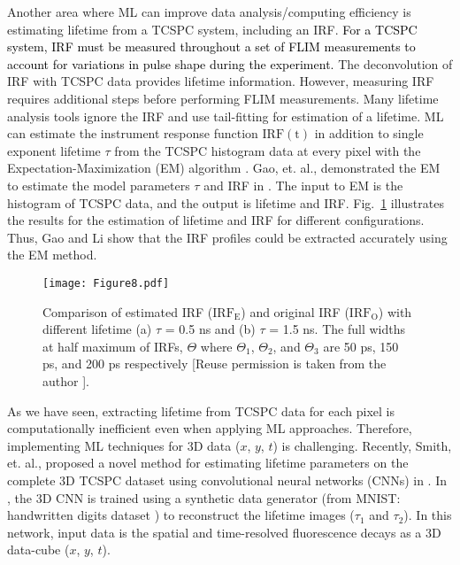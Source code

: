 \documentclass[12pt]{iopart}
\newcommand{\cc}[1]{\textcolor{black}{#1}}
\begin{document}
Another area where ML can improve data analysis/computing efficiency is estimating lifetime from a TCSPC system, including an IRF. \cc{For a TCSPC system, IRF must be measured throughout a set of FLIM measurements to account for variations in pulse shape during the experiment.} The deconvolution of IRF with TCSPC data provides lifetime information. However, measuring IRF requires additional steps before performing FLIM measurements. Many lifetime analysis tools ignore the IRF and use tail-fitting for estimation of a lifetime. ML can estimate the instrument response function $\mathrm{IRF(t)}$ in addition to single exponent lifetime $\tau$ from the TCSPC histogram data at every pixel with the Expectation-Maximization (EM) algorithm \cite{em}. Gao, et. al., demonstrated the EM to estimate the model parameters $\tau$ and IRF in \cite{em}. The input to EM is the histogram of TCSPC data, and the output is lifetime and IRF. Fig.~\ref{fig1_em} illustrates the results for the estimation of lifetime and IRF for different configurations. Thus, Gao and Li \cite{em} show that the IRF profiles could be extracted accurately using the EM method.

\begin{figure}[!t]
\centering
\texttt{[image: Figure8.pdf]}
\caption{Comparison of estimated IRF ($\mathrm{IRF_E}$) and original IRF ($\mathrm{IRF_O}$) with different lifetime (a) $\tau$ = 0.5 ns and (b) $\tau$ = 1.5 ns. The full widths at half maximum of IRFs, $\Theta$ where $\Theta_1$, $\Theta_2$, and $\Theta_3$ are 50 ps, 150 ps, and 200 ps respectively [Reuse permission is taken from the author \cite{em}].}\label{fig1_em}
\end{figure}

As we have seen, extracting lifetime from TCSPC data for each pixel is computationally inefficient even when applying ML approaches. Therefore, implementing ML techniques for 3D data ($x$, $y$, $t$) is challenging. Recently, Smith, et. al., proposed a novel method for estimating lifetime parameters on the complete 3D TCSPC dataset using convolutional neural networks (CNNs) in \cite{netflics2}. In \cite{netflics2}, the 3D CNN is trained using a synthetic data generator (from MNIST: handwritten digits dataset \cite{mnist}) to reconstruct the lifetime images ($\tau_1$ and $\tau_2$). In this network, input data is the spatial and time-resolved fluorescence decays as a 3D data-cube ($x$, $y$, $t$).
\end{document}
